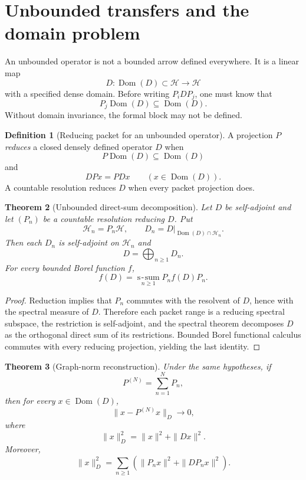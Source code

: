 \documentclass[11pt]{article}
\newtheorem{theorem}{Theorem}[section]
\theoremstyle{definition}
\newtheorem{definition}[theorem]{Definition}
\theoremstyle{remark}
\begin{document}
\section{Unbounded transfers and the domain problem}

An unbounded operator is not a bounded arrow defined everywhere.  It is a linear map
\[
D:\operatorname{Dom}(D)\subset\mathcal H\to\mathcal H
\]
with a specified dense domain.  Before writing $P_iDP_j$, one must know that
\[
P_j\operatorname{Dom}(D)\subseteq\operatorname{Dom}(D).
\]
Without domain invariance, the formal block may not be defined.

\begin{definition}[Reducing packet for an unbounded operator]
A projection $P$ \emph{reduces} a closed densely defined operator $D$ when
\[
P\operatorname{Dom}(D)\subseteq\operatorname{Dom}(D)
\]
and
\[
DPx=PDx
\qquad
(x\in\operatorname{Dom}(D)).
\]
A countable resolution reduces $D$ when every packet projection does.
\end{definition}

\begin{theorem}[Unbounded direct-sum decomposition]
Let $D$ be self-adjoint and let $(P_n)$ be a countable resolution reducing $D$.  Put
\[
\mathcal H_n=P_n\mathcal H,
\qquad
D_n=D|_{\operatorname{Dom}(D)\cap\mathcal H_n}.
\]
Then each $D_n$ is self-adjoint on $\mathcal H_n$ and
\[
D=\bigoplus_{n\ge1}D_n.
\]
For every bounded Borel function $f$,
\[
f(D)=\operatorname*{s\! -\! sum}_{n\ge1}P_nf(D)P_n.
\]
\end{theorem}

\begin{proof}
Reduction implies that $P_n$ commutes with the resolvent of $D$, hence with the spectral measure of $D$.  Therefore each packet range is a reducing spectral subspace, the restriction is self-adjoint, and the spectral theorem decomposes $D$ as the orthogonal direct sum of its restrictions.  Bounded Borel functional calculus commutes with every reducing projection, yielding the last identity.
\end{proof}

\begin{theorem}[Graph-norm reconstruction]
Under the same hypotheses, if
\[
P^{(N)}=\sum_{n=1}^NP_n,
\]
then for every $x\in\operatorname{Dom}(D)$,
\[
\|x-P^{(N)}x\|_D\longrightarrow0,
\]
where
\[
\|x\|_D^2=\|x\|^2+\|Dx\|^2.
\]
Moreover,
\[
\|x\|_D^2
=
\sum_{n\ge1}
\left(
\|P_nx\|^2+\|DP_nx\|^2
\right).
\]
\end{theorem}
\end{document}
